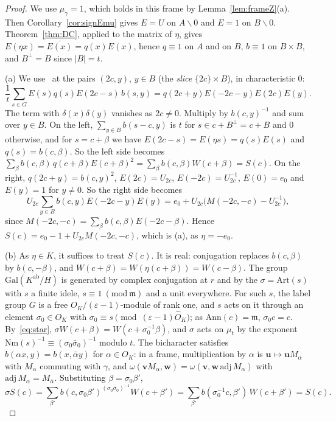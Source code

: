 \documentclass[11pt]{amsart}
\numberwithin{equation}{section}
\theoremstyle{plain}
\theoremstyle{definition}
\theoremstyle{remark}
\begin{document}
\begin{proof}
We use \(\mu_\gamma=1\), which holds in this frame by Lemma~\ref{lem:frameZ}(a). Then Corollary~\ref{cor:signEmu} gives \(E=U\) on \(A\smallsetminus0\) and \(E=1\) on \(B\smallsetminus0\). Theorem~\ref{thm:DC}, applied to the matrix of \(\eta\), gives \(E(\eta x)=\overline{E(x)}=q(x)E(x)\), hence \(q\equiv1\) on \(A\) and on \(B\), \(b\equiv1\) on \(B\times B\), and \(B^\perp=B\) since \(|B|=t\).

(a) We use~\cite[(36)]{RW} at the pairs \((2c,y)\), \(y\in B\) (the \emph{slice} \(\{2c\}\times B\)), in characteristic \(0\):
\[\frac1t\sum_{s\in G}E(s)q(s)E(2c-s)\,b(s,y)=q(2c+y)E(-2c-y)E(2c)E(y).\]
The term with \(\delta(x)\delta(y)\) vanishes as \(2c\ne0\). Multiply by \(b(c,y)^{-1}\) and sum over \(y\in B\). On the left, \(\sum_{y\in B}b(s-c,y)\) is \(t\) for \(s\in c+B^\perp=c+B\) and \(0\) otherwise, and for \(s=c+\beta\) we have \(E(2c-s)=E(\eta s)=q(s)E(s)\) and \(q(s)=b(c,\beta)\). So the left side becomes \(\sum_\beta b(c,\beta)\,q(c+\beta)E(c+\beta)^2=\sum_\beta b(c,\beta)W(c+\beta)=S(c)\). On the right, \(q(2c+y)=b(c,y)^2\), \(E(2c)=U_{2c}\), \(E(-2c)=U_{2c}^{-1}\), \(E(0)=e_0\) and \(E(y)=1\) for \(y\ne0\). So the right side becomes
\[U_{2c}\sum_{y\in B}b(c,y)E(-2c-y)E(y)=e_0+U_{2c}\bigl(M(-2c,-c)-U_{2c}^{-1}\bigr),\]
since \(M(-2c,-c)=\sum_\beta b(c,\beta)E(-2c-\beta)\). Hence \(S(c)=e_0-1+U_{2c}M(-2c,-c)\), which is (a), as \(\eta=-e_0\).

(b) As \(\eta\in K\), it suffices to treat \(S(c)\). It is real: conjugation replaces \(b(c,\beta)\) by \(b(c,-\beta)\), and \(W(c+\beta)=W(\eta(c+\beta))=W(c-\beta)\). The group \(\mathrm{Gal}(K^{\mathrm{ab}}/H)\) is generated by complex conjugation at \(r\) and by the \(\sigma=\mathrm{Art}(s)\) with \(s\) a finite idele, \(s\equiv1\ (\mathrm{mod}\ \mathfrak m)\) and a unit everywhere. For such \(s\), the label group \(G\) is a free \(O_K/(\varepsilon-1)\)-module of rank one, and \(s\) acts on it through an element \(\sigma_0\in O_K\) with \(\sigma_0\equiv s\pmod{(\varepsilon-1)\widehat O_K}\); as \(\mathrm{Ann}(c)=\mathfrak m\), \(\sigma_0c=c\). By~\eqref{eq:star}, \(\sigma W(c+\beta)=W(c+\sigma_0^{-1}\beta)\), and \(\sigma\) acts on \(\mu_t\) by the exponent \(\mathrm{Nm}(s)^{-1}\equiv(\sigma_0\bar\sigma_0)^{-1}\) modulo \(t\). The bicharacter satisfies \(b(\alpha x,y)=b(x,\bar\alpha y)\) for \(\alpha\in O_K\): in a frame, multiplication by \(\alpha\) is \(\mathbf u\mapsto\mathbf uM_\alpha\) with \(M_\alpha\) commuting with \(\gamma\), and \(\omega(\mathbf vM_\alpha,\mathbf w)=\omega(\mathbf v,\mathbf w\,\mathrm{adj}\,M_\alpha)\) with \(\mathrm{adj}\,M_\alpha=M_{\bar\alpha}\). Substituting \(\beta=\sigma_0\beta'\),
\[\sigma S(c)=\sum_{\beta'}b(c,\sigma_0\beta')^{(\sigma_0\bar\sigma_0)^{-1}}W(c+\beta')=\sum_{\beta'}b(\sigma_0^{-1}c,\beta')\,W(c+\beta')=S(c).\]


\end{proof}
\end{document}
